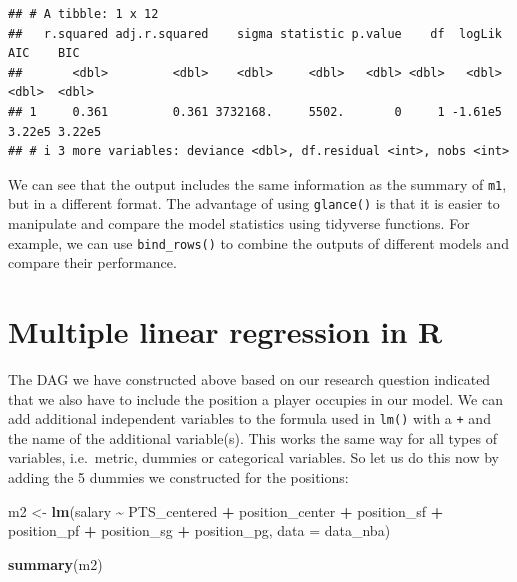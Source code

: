 \documentclass[
]{book}
\newenvironment{Shaded}{\begin{snugshade}}{\end{snugshade}}
\newcommand{\AttributeTok}[1]{\textcolor[rgb]{0.13,0.29,0.53}{#1}}
\newcommand{\FunctionTok}[1]{\textcolor[rgb]{0.13,0.29,0.53}{\textbf{#1}}}
\newcommand{\NormalTok}[1]{#1}
\newcommand{\OtherTok}[1]{\textcolor[rgb]{0.56,0.35,0.01}{#1}}
\newcommand{\SpecialCharTok}[1]{\textcolor[rgb]{0.81,0.36,0.00}{\textbf{#1}}}
\begin{document}
\begin{verbatim}
## # A tibble: 1 x 12
##   r.squared adj.r.squared    sigma statistic p.value    df  logLik    AIC    BIC
##       <dbl>         <dbl>    <dbl>     <dbl>   <dbl> <dbl>   <dbl>  <dbl>  <dbl>
## 1     0.361         0.361 3732168.     5502.       0     1 -1.61e5 3.22e5 3.22e5
## # i 3 more variables: deviance <dbl>, df.residual <int>, nobs <int>
\end{verbatim}

We can see that the output includes the same information as the summary of \texttt{m1}, but in a different format. The advantage of using \texttt{glance()} is that it is easier to manipulate and compare the model statistics using tidyverse functions. For example, we can use \texttt{bind\_rows()} to combine the outputs of different models and compare their performance.

\hypertarget{multiple-linear-regression-in-r}{%
\section{Multiple linear regression in R}\label{multiple-linear-regression-in-r}}

The DAG we have constructed above based on our research question indicated that
we also have to include the position a player occupies in our model.
We can add additional independent variables to the formula used in \texttt{lm()} with a
\texttt{+} and the name of the additional variable(s). This works the same way for all
types of variables, i.e.~metric, dummies or categorical variables.
So let us do this now by adding the 5 dummies we constructed for the positions:

\begin{Shaded}
\begin{Highlighting}[]
\NormalTok{m2 }\OtherTok{\textless{}{-}} \FunctionTok{lm}\NormalTok{(salary }\SpecialCharTok{\textasciitilde{}}\NormalTok{ PTS\_centered }\SpecialCharTok{+}\NormalTok{ position\_center }\SpecialCharTok{+}\NormalTok{ position\_sf }\SpecialCharTok{+}\NormalTok{  position\_pf }\SpecialCharTok{+}\NormalTok{ position\_sg }\SpecialCharTok{+}\NormalTok{ position\_pg, }\AttributeTok{data =}\NormalTok{ data\_nba)}

\FunctionTok{summary}\NormalTok{(m2)}
\end{Highlighting}
\end{Shaded}
\end{document}
